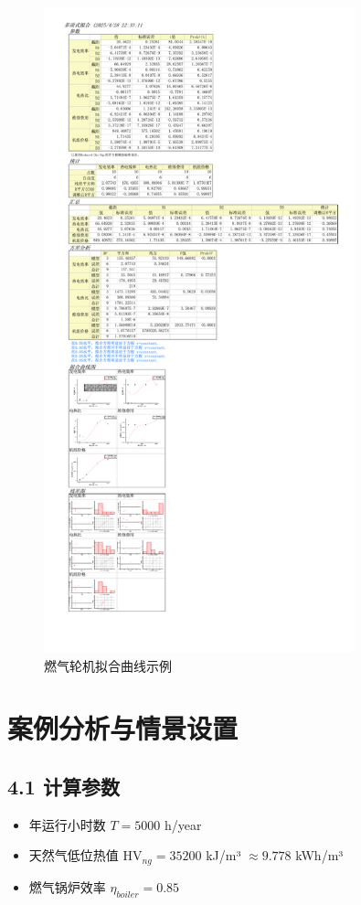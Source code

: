 \documentclass[12pt]{ctexart}
\begin{document}
\begin{figure}[H]
  \centering
  \includegraphics[width=0.8\textwidth]{fig/实践2_燃气轮机_拟合曲线.pdf} %
  \caption{燃气轮机拟合曲线示例}
  \label{fig:price_fit}
\end{figure}


\section{案例分析与情景设置}
\subsection{4.1 计算参数}
\begin{itemize}
    \item 年运行小时数 $T = 5000$ h/year
    \item 天然气低位热值 $\text{HV}_{ng} = 35200$ kJ/m³ $\approx 9.778$ kWh/m³
    \item 燃气锅炉效率 $\eta_{boiler} = 0.85$
\end{itemize}
\end{document}
